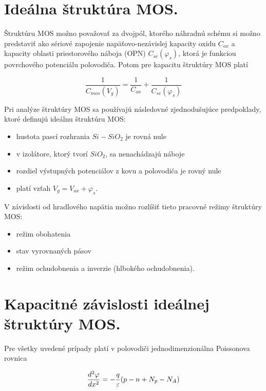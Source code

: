 \section{Ideálna štruktúra MOS.}

Štruktúru MOS možno považovať za dvojpól, ktorého náhradnú schému si
možno predstaviť ako sériové zapojenie napäťovo-nezávislej kapacity
oxidu $C_{ox}$ a kapacity oblasti priestorového náboja (OPN)
$C_{sc}(\varphi_{s})$, ktorá je funkciou povrchového potenciálu
polovodiča. Potom pre kapacitu štruktúry MOS platí~\cite{I.1}

\begin{equation}\label{eq:1.1}
  \frac{1}{C_{mos}(V_g)} = \frac{1}{C_{ox}} + \frac{1}{C_{sc}(\varphi_s)}
\end{equation}

Pri analýze štruktúry MOS sa používajú následovné zjednodušujúce
predpoklady, ktoré definujú ideálnu štruktúru MOS\@:

\begin{itemize}
\item hustota pascí rozhrania $Si-SiO_2$ je rovná nule 
\item v izolátore, ktorý tvorí $SiO_2$, sa nenachádzajú náboje 
\item rozdiel výstupných potenciálov z kovu a polovodiča je rovný nule
\item platí vzťah $V_{g}=V_{ox}+\varphi_{s}$.
\end{itemize}

\noindent V závislosti od hradlového napätia možno rozlíšiť tieto
pracovné režimy štruktúry MOS\@:

\begin{itemize}
\item režim obohatenia
\item stav vyrovnaných pásov
\item režim ochudobnenia a inverzie (hlbokého ochudobnenia).
\end{itemize}

\section{Kapacitné závislosti ideálnej štruktúry MOS.}

Pre všetky uvedené prípady platí v polovodiči jednodimenzionálna
Poissonova rovnica

\begin{equation}\label{eq:1.2}\index{Poissonova rovnica}
  \frac{d^2\varphi}{dx^2} = -\frac{q}{\varepsilon}(p-n+N_{p}-N_{A})
\end{equation}

